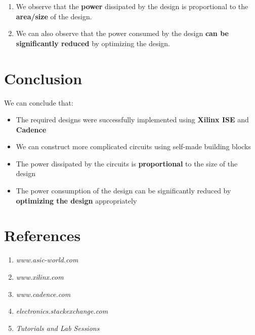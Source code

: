 \documentclass[a4paper,10pt]{report}
\begin{document}
\begin{enumerate}
	\item We observe that the \textbf{power} dissipated by the design is proportional to the \textbf{area/size} of the design.
	\item We can also observe that the power consumed by the design \textbf{can be significantly reduced} by optimizing the design.
\end{enumerate}

\section{Conclusion}

We can conclude that:
\begin{itemize}
	\item The required designs were successfully implemented using \textbf{Xilinx ISE} and \textbf{Cadence}
	\item We can construct more complicated circuits using self-made building blocks
	\item The power dissipated by the circuits is \textbf{proportional} to the size of the design
	\item The power consumption of the design can be significantly reduced by \textbf{optimizing the design} appropriately
\end{itemize}

\section{References}
\begin{enumerate}
	\item \textit{www.asic-world.com}
	\item \textit{www.xilinx.com}
	\item \textit{www.cadence.com}
	\item \textit{electronics.stackexchange.com}
	\item \textit{Tutorials and Lab Sessions}
\end{enumerate}
\end{document}
